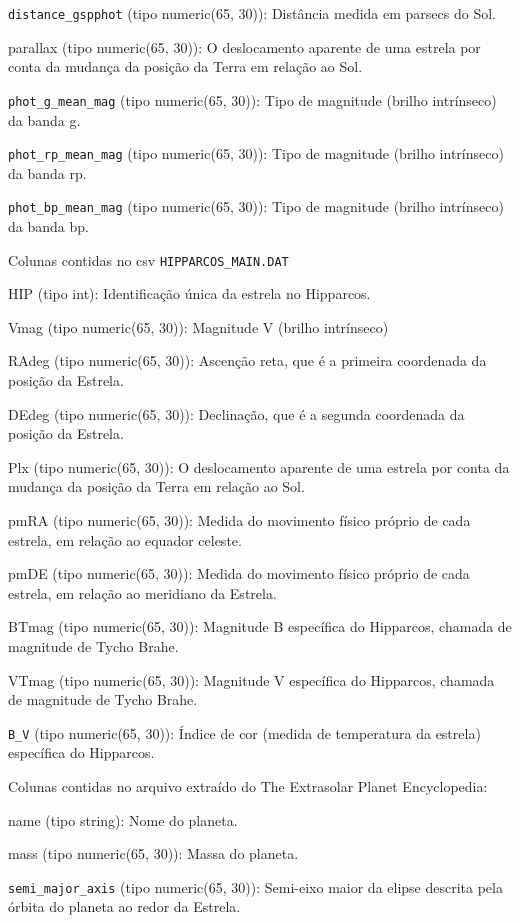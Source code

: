 \documentclass[12pt, a4paper]{article}
\begin{document}
	\verb|distance_gspphot| (tipo numeric(65, 30)):
	Distância medida em parsecs do Sol.
	
	parallax (tipo numeric(65, 30)):
	O deslocamento aparente de uma estrela por conta da mudança da posição da Terra em relação ao Sol.
	
	\verb|phot_g_mean_mag| (tipo numeric(65, 30)):
	Tipo de magnitude (brilho intrínseco) da banda g.
	
	\verb|phot_rp_mean_mag| (tipo numeric(65, 30)):
	Tipo de magnitude (brilho intrínseco) da banda rp.
	
	\verb|phot_bp_mean_mag| (tipo numeric(65, 30)):
	Tipo de magnitude (brilho intrínseco) da banda bp.
	
	Colunas contidas no csv \verb|HIPPARCOS_MAIN.DAT|
	
	HIP (tipo int):
	Identificação única da estrela no Hipparcos.
	
	Vmag (tipo numeric(65, 30)):
	Magnitude V (brilho intrínseco) 
	
	RAdeg (tipo numeric(65, 30)):
	Ascenção reta, que é a primeira coordenada da posição da Estrela.
	
	DEdeg (tipo numeric(65, 30)):
	Declinação, que é a segunda coordenada da posição da Estrela.
	
	Plx (tipo numeric(65, 30)):
	O deslocamento aparente de uma estrela por conta da mudança da posição da Terra em relação ao Sol.
	
	pmRA (tipo numeric(65, 30)):
	Medida do movimento físico próprio de cada estrela, em relação ao equador celeste.
	
	pmDE (tipo numeric(65, 30)):
	Medida do movimento físico próprio de cada estrela, em relação ao meridiano da Estrela.
	
	BTmag (tipo numeric(65, 30)):
	Magnitude B específica do Hipparcos, chamada de magnitude de Tycho Brahe.
	
	VTmag (tipo numeric(65, 30)):
	Magnitude V específica do Hipparcos, chamada de magnitude de Tycho Brahe.
	
	\verb|B_V| (tipo numeric(65, 30)):
	Índice de cor (medida de temperatura da estrela) específica do Hipparcos.
	
	Colunas contidas no arquivo extraído do The Extrasolar Planet Encyclopedia:
	
	name (tipo string):
	Nome do planeta.
	
	mass (tipo numeric(65, 30)):
	Massa do planeta.
	
	\verb|semi_major_axis| (tipo numeric(65, 30)):
	Semi-eixo maior da elipse descrita pela órbita do planeta ao redor da Estrela.
	
\end{document}
